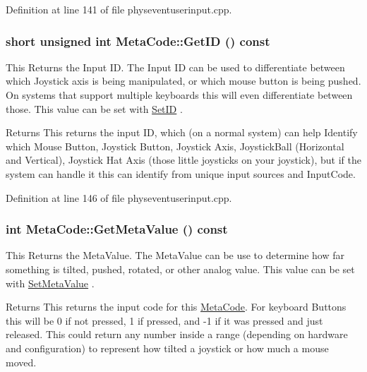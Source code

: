 Definition at line 141 of file physeventuserinput.cpp.\hypertarget{classMetaCode_a680b5e1c2ce8d8d08d00f10187728547}{
\subsubsection[{GetID}]{\setlength{\rightskip}{0pt plus 5cm}short unsigned int MetaCode::GetID () const}}
\label{d7/d72/classMetaCode_a680b5e1c2ce8d8d08d00f10187728547}


This Returns the Input ID. The Input ID can be used to differentiate between which Joystick axis is being manipulated, or which mouse button is being pushed. On systems that support multiple keyboards this will even differentiate between those. This value can be set with \hyperlink{classMetaCode_a0eb10030320a1fcfdda3b867b90e629f}{SetID} . \begin{DoxyReturn}{Returns}
This returns the input ID, which (on a normal system) can help Identify which Mouse Button, Joystick Button, Joystick Axis, JoystickBall (Horizontal and Vertical), Joystick Hat Axis (those little joysticks on your joystick), but if the system can handle it this can identify from unique input sources and InputCode. 
\end{DoxyReturn}


Definition at line 146 of file physeventuserinput.cpp.\hypertarget{classMetaCode_a8d9cd9709ab51323d7061cf7b0ea4ee2}{
\subsubsection[{GetMetaValue}]{\setlength{\rightskip}{0pt plus 5cm}int MetaCode::GetMetaValue () const}}
\label{d7/d72/classMetaCode_a8d9cd9709ab51323d7061cf7b0ea4ee2}


This Returns the MetaValue. The MetaValue can be use to determine how far something is tilted, pushed, rotated, or other analog value. This value can be set with \hyperlink{classMetaCode_a1e410df95815b4d7e94b971bb1b8ba1e}{SetMetaValue} . \begin{DoxyReturn}{Returns}
This returns the input code for this \hyperlink{classMetaCode}{MetaCode}. For keyboard Buttons this will be 0 if not pressed, 1 if pressed, and -\/1 if it was pressed and just released. This could return any number inside a range (depending on hardware and configuration) to represent how tilted a joystick or how much a mouse moved. 
\end{DoxyReturn}


